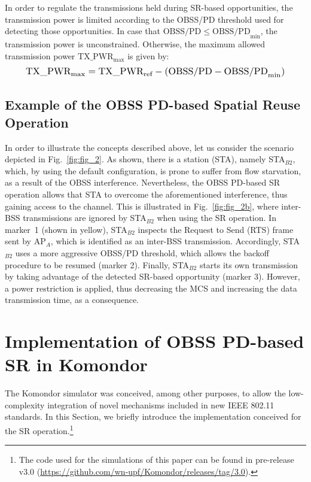 \documentclass[conference]{IEEEtran}
\begin{document}
	In order to regulate the transmissions held during SR-based opportunities, the transmission power is limited according to the OBSS/PD threshold used for detecting those opportunities. In case that $\text{OBSS/PD} \leq \text{OBSS/PD}_{\min}$, the transmission power is unconstrained. Otherwise, the maximum allowed transmission power $\text{TX\_PWR}_{\max}$ is given by:
	\begin{equation}
	\resizebox{.9\columnwidth}{!}{$\text{TX\_PWR}_{\max} = \text{TX\_PWR}_{\text{ref}} - (\text{OBSS/PD} -\text{OBSS/PD}_{\min})$}
	\label{eq:power_restriction}
	\end{equation}
	
	\subsection{Example of the OBSS PD-based Spatial Reuse Operation}
	
	In order to illustrate the concepts described above, let us consider the scenario depicted in Fig.~\ref{fig:fig_2}. As shown, there is a station (STA), namely STA$_{B2}$, which, by using the default configuration, is prone to suffer from flow starvation, as a result of the OBSS interference. Nevertheless, the OBSS PD-based SR operation allows that STA to overcome the aforementioned interference, thus gaining access to the channel. This is illustrated in Fig.~\ref{fig:fig_2b}, where inter-BSS transmissions are ignored by STA$_{B2}$ when using the SR operation. In marker~1 (shown in yellow), STA$_{B2}$ inspects the Request to Send (RTS) frame sent by AP$_A$, which is identified as an inter-BSS transmission. Accordingly, STA$_{B2}$ uses a more aggressive OBSS/PD threshold, which allows the backoff procedure to be resumed (marker 2). Finally, STA$_{B2}$ starts its own transmission by taking advantage of the detected SR-based opportunity (marker 3). However, a power restriction is applied, thus decreasing the MCS and increasing the data transmission time, as a consequence.
	
	\section{Implementation of OBSS PD-based SR in Komondor}
	\label{section:komondor}
	
	The Komondor simulator was conceived, among other purposes, to allow the low-complexity integration of novel mechanisms included in new IEEE 802.11 standards. In this Section, we briefly introduce the implementation conceived for the SR operation.\footnote{The code used for the simulations of this paper can be found in pre-release v3.0 (\url{https://github.com/wn-upf/Komondor/releases/tag/3.0}).}
	
\end{document}
